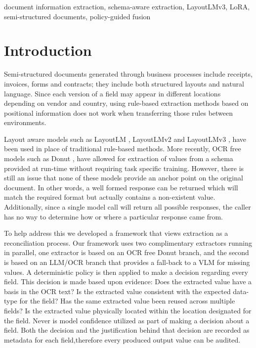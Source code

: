 \documentclass[conference]{IEEEtran}
\begin{document}
\begin{IEEEkeywords}
document information extraction, schema-aware extraction, LayoutLMv3, LoRA,
semi-structured documents, policy-guided fusion
\end{IEEEkeywords}

\section{Introduction}

Semi-structured documents generated through business processes include receipts, invoices, forms and contracts; they include both structured layouts and natural language. Since each version of a field may appear in different locations depending on vendor and country, using rule-based extraction methods based on positional information does not work when transferring those rules between environments.

Layout aware models such as LayoutLM \cite{layoutlm}, LayoutLMv2 \cite{layoutlmv2} and LayoutLMv3 \cite{layoutlmv3}, have been used in place of traditional rule-based methods. More recently, OCR free models such as Donut \cite{kim2022donut}, have allowed for extraction of values from a schema provided at run-time without requiring task specific training. However, there is still an issue that none of these models provide an anchor point on the original document. In other words, a well formed response can be returned which will match the required format but actually contains a non-existent value. Additionally, since a single model call will return all possible responses, the caller has no way to determine how or where a particular response came from.

To help address this we developed a framework that views extraction as a reconciliation process. Our framework uses two complimentary extractors running in parallel, one extractor is based on an OCR free Donut branch, and the second is based on an LLM/OCR branch that provides a fall-back to a VLM for missing values. A deterministic policy is then applied to make a decision regarding every field. This decision is made based upon evidence: Does the extracted value have a basis in the OCR text? Is the extracted value consistent with the expected data-type for the field? Has the same extracted value been reused across multiple fields? Is the extracted value physically located within the location designated for the field. Never is model confidence utilized as part of making a decision about a field. Both the decision and the justification behind that decision are recorded as metadata for each field,therefore every produced output value can be audited.
\end{document}
